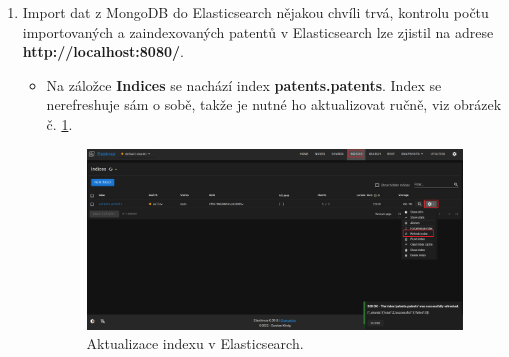 \begin{enumerate}
\begin{figure}[H]
		\end{figure}
\item Import dat z MongoDB do Elasticsearch nějakou chvíli trvá, kontrolu počtu importovaných a zaindexovaných patentů v Elasticsearch lze zjistil na adrese \textbf{http://localhost:8080/}.
	\begin{itemize}
	\item Na záložce \textbf{Indices} se nachází index \textbf{patents.patents}. Index se nerefreshuje sám o sobě, takže je nutné ho aktualizovat ručně, viz obrázek č. \ref{fig:refresh_index}.
		\begin{figure}[H]
		\centering
		\includegraphics[width=15cm]{img/manual/refresh_index}
		\caption{Aktualizace indexu v Elasticsearch.}
		\label{fig:refresh_index}
		\end{figure}
	\end{itemize}
\end{enumerate}